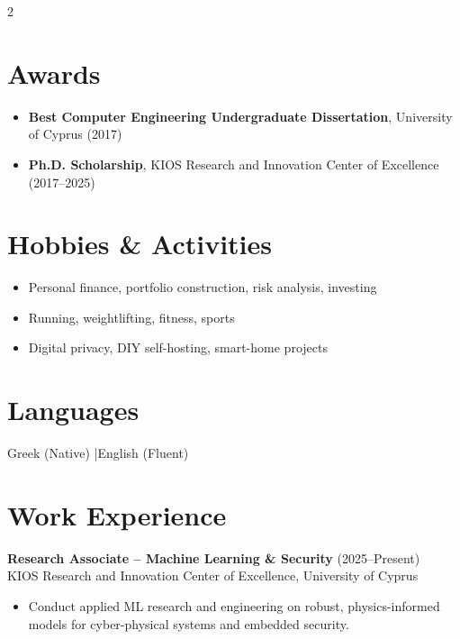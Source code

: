 \documentclass[10pt,a4paper]{article}
\begin{document}
\begin{multicols}{2}
\section*{Awards}
\begin{itemize}
  \item \textbf{Best Computer Engineering Undergraduate Dissertation}, University of Cyprus (2017)
  \item \textbf{Ph.D. Scholarship}, KIOS Research and Innovation Center of Excellence (2017--2025)
\end{itemize}

\section*{Hobbies \& Activities}
\begin{itemize}
  \item Personal finance, portfolio construction, risk analysis, investing
  \item Running, weightlifting, fitness, sports
  \item Digital privacy, DIY self-hosting, smart-home projects
\end{itemize}

\section*{Languages}
Greek (Native) \quad|\quad English (Fluent)

\section*{Work Experience}
\textbf{Research Associate -- Machine Learning \& Security} (2025--Present)\\
KIOS Research and Innovation Center of Excellence, University of Cyprus
\begin{itemize}
  \item Conduct applied ML research and engineering on robust, physics-informed models for cyber-physical systems and embedded security.
\end{itemize}


\end{multicols}
\end{document}
